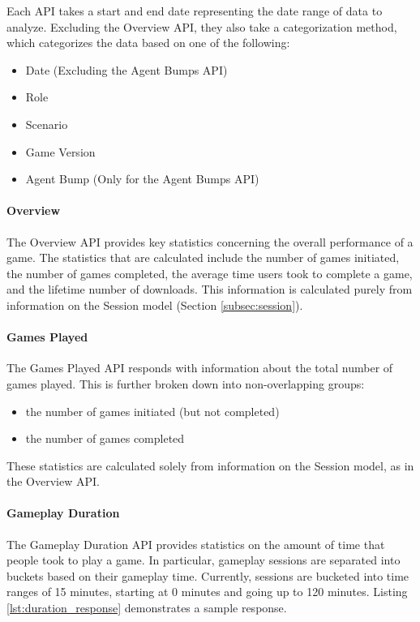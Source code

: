 Each API takes a start and end date representing the date range of data to analyze. Excluding the Overview API, they also take a categorization method, which categorizes the data based on one of the following:
	\begin{itemize}
		\item Date (Excluding the Agent Bumps API)
		\item Role
		\item Scenario
		\item Game Version
		\item Agent Bump (Only for the Agent Bumps API)
	\end{itemize}

\paragraph{Overview}

The Overview API provides key statistics concerning the overall performance of a game. The statistics that are calculated include the number of games initiated, the number of games completed, the average time users took to complete a game, and the lifetime number of downloads. This information is calculated purely from information on the Session model (Section \ref{subsec:session}).

\paragraph{Games Played}

The Games Played API responds with information about the total number of games played. This is further broken down into non-overlapping groups:
	\begin{itemize}
		\item the number of games initiated (but not completed)
		\item the number of games completed
	\end{itemize}

These statistics are calculated solely from information on the Session model, as in the Overview API.

\paragraph{Gameplay Duration}

The Gameplay Duration API provides statistics on the amount of time that people took to play a game. In particular, gameplay sessions are separated into buckets based on their gameplay time. Currently, sessions are bucketed into time ranges of 15 minutes, starting at 0 minutes and going up to 120 minutes. Listing \ref{lst:duration_response} demonstrates a sample response.

